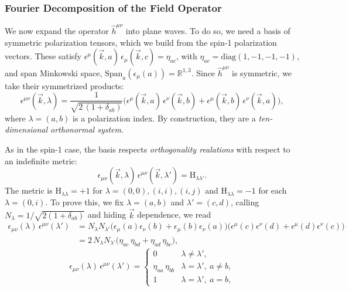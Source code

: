 \documentclass[12pt,a4paper,oneside]{article}
\numberwithin{equation}{section}   %
\begin{document}
\subsubsection{Fourier Decomposition of the Field Operator}

We now expand the operator $\hat{h}^{\mu\nu}$ into plane waves. To do so, we
need a basis of symmetric polarization tensors, which we build from the spin-1
polarization vectors. These satisfy
$\epsilon^{\mu}(\vec k,a)\,\epsilon_{\mu}(\vec k,c)=\eta_{ac}$, with
$\eta_{ac}=\mathrm{diag}(1,-1,-1,-1)$, and span Minkowski space,
$\text{Span}_a(\epsilon_\mu(a)) = \mathbb{R}^{1,3}$.
Since $\hat h^{\mu\nu}$ is symmetric, we take their symmetrized products:
\begin{equation}
\epsilon^{\mu\nu}(\vec{k},\lambda)
=\frac{1}{\sqrt{2\,(1+\delta_{ab})}}
\bigl(\epsilon^{\mu}(\vec{k},a)\,\epsilon^{\nu}(\vec{k},b)
+\epsilon^{\mu}(\vec{k},b)\,\epsilon^{\nu}(\vec{k},a)\bigr),
\end{equation}
where $\lambda=(a,b)$ is a polarization index. By construction, they
are a \textit{ten-dimensional orthonormal system}.

As in the spin-1 case, the basis respects \textit{orthogonality 
realations} with respect to an indefinite
metric:
\begin{equation}
  \epsilon_{\mu\nu}(\vec{k},\lambda)\,
  \epsilon^{\mu\nu}(\vec{k},\lambda')=\mathrm{H}_{\lambda\lambda'}.
  \label{eq:orthonormality}
\end{equation}
The metric is $\mathrm{H}_{\lambda\lambda}=+1$ for
$\lambda=(0,0),(i,i),(i,j)$ and $\mathrm{H}_{\lambda\lambda}=-1$ for each
$\lambda=(0,i)$.
To prove this, we fix $\lambda=(a,b)$ and $\lambda'=(c,d)$, calling
 $N_\lambda=1/\sqrt{2(1+\delta_{ab})}$ and hiding
$\vec k$ dependence, we read
\begin{align}
\epsilon_{\mu\nu}(\lambda)\,\epsilon^{\mu\nu}(\lambda')
&=N_\lambda N_{\lambda'}
\bigl(\epsilon_{\mu}(a)\epsilon_{\nu}(b)+\epsilon_{\mu}(b)\epsilon_{\nu}(a)\bigr)
\bigl(\epsilon^{\mu}(c)\epsilon^{\nu}(d)+\epsilon^{\mu}(d)\epsilon^{\nu}(c)\bigr)\nonumber\\
&=2\,N_\lambda N_{\lambda'}\bigl(\eta_{ac}\,\eta_{bd}+\eta_{ad}\,\eta_{bc}\bigr),
\end{align}
\begin{equation}
\epsilon_{\mu\nu}(\lambda)\,\epsilon^{\mu\nu}(\lambda') =
\begin{cases}
0 & \lambda\neq\lambda', \\[2pt]
\eta_{aa}\,\eta_{bb} & \lambda=\lambda',\ a\neq b, \\[2pt]
1 & \lambda=\lambda',\ a=b,
\end{cases}
\tag*{$\Box$}
\end{equation}
\end{document}
